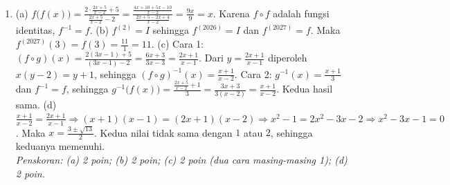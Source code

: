 \documentclass[a4paper,11pt]{article}
\newcommand{\dis}{\displaystyle}
\begin{document}
\begin{enumerate}[leftmargin=2em,itemsep=3pt,topsep=2pt]
\item[\textbf{5.}] (a) $f\big(f(x)\big)=\dis\frac{2\cdot\frac{2x+5}{x-2}+5}{\frac{2x+5}{x-2}-2}=\dis\frac{\frac{4x+10+5x-10}{x-2}}{\frac{2x+5-2x+4}{x-2}}=\dis\frac{9x}{9}=x$. Karena $f\circ f$ adalah fungsi identitas, $f^{-1}=f$. (b) $f^{(2)}=I$ sehingga $f^{(2026)}=I$ dan $f^{(2027)}=f$. Maka $f^{(2027)}(3)=f(3)=\dis\frac{11}{1}=11$. (c) Cara 1: $(f\circ g)(x)=\dis\frac{2(3x-1)+5}{(3x-1)-2}=\dis\frac{6x+3}{3x-3}=\dis\frac{2x+1}{x-1}$. Dari $y=\dis\frac{2x+1}{x-1}$ diperoleh $x(y-2)=y+1$, sehingga $(f\circ g)^{-1}(x)=\dis\frac{x+1}{x-2}$. Cara 2: $g^{-1}(x)=\dis\frac{x+1}{3}$ dan $f^{-1}=f$, sehingga $g^{-1}\big(f(x)\big)=\dis\frac{\frac{2x+5}{x-2}+1}{3}=\dis\frac{3x+3}{3(x-2)}=\dis\frac{x+1}{x-2}$. Kedua hasil sama. (d) $\dis\frac{x+1}{x-2}=\dis\frac{2x+1}{x-1}\Rightarrow(x+1)(x-1)=(2x+1)(x-2)\Rightarrow x^2-1=2x^2-3x-2\Rightarrow x^2-3x-1=0$. Maka $x=\dis\frac{3\pm\sqrt{13}}{2}$. Kedua nilai tidak sama dengan $1$ atau $2$, sehingga keduanya memenuhi. \\ \textit{Penskoran: (a) 2 poin; (b) 2 poin; (c) 2 poin (dua cara masing-masing 1); (d) 2 poin.}
\end{enumerate}
\end{document}

